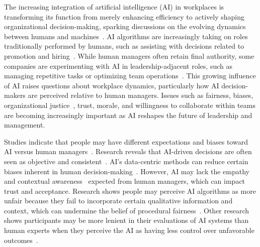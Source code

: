 \documentclass{article}
\begin{document}
The increasing integration of artificial intelligence (AI) in workplaces is transforming its function from merely enhancing efficiency to actively shaping organizational decision-making, sparking discussions on the evolving dynamics between humans and machines~\cite{tsvetkova2024new}. 
AI algorithms are increasingly taking on roles traditionally performed by humans, such as assisting with decisions related to promotion and hiring~\cite{kelan2024algorithmic, mainka2019algorithm}. While human managers often retain final authority, some companies are experimenting with AI in leadership-adjacent roles, such as managing repetitive tasks or optimizing team operations~\cite{kiron2023workforce}. This growing influence of AI raises questions about workplace dynamics, particularly how AI decision-makers are perceived relative to human managers. Issues such as fairness, biases, organizational justice~\cite{colquitt2001justice}, trust, morale, and willingness to collaborate within teams are becoming increasingly important as AI reshapes the future of leadership and management. %

Studies indicate that people may have different expectations and biases toward AI versus human managers~\cite{logg2019algorithm, logg2024simple}. 
Research reveals that AI-driven decisions are often seen as objective and consistent~\cite{jones2023people}.
AI's data-centric methods can reduce certain biases inherent in human decision-making~\cite{hofeditz2022applying}. 
However, AI may lack the empathy~\cite{montemayor2022principle} and contextual awareness~\cite{mitchell2021abstraction} expected from human managers, which can impact trust and acceptance. 
Research shows people may perceive AI algorithms as more unfair because they fail to incorporate certain qualitative information and context, which can undermine the belief of procedural fairness~\cite{newman2020eliminating}.  
Other research shows participants may be more lenient in their evaluations of AI systems than human experts when they perceive the AI as having less control over unfavorable outcomes~\cite{jones2023people}.
\end{document}

